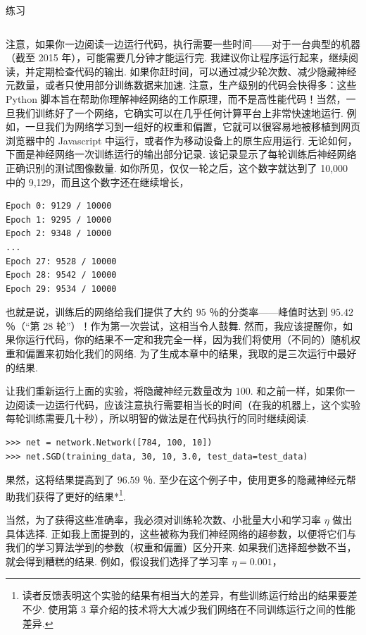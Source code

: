\begin{exerciseBox}{练习}
\begin{lstlisting}
\end{lstlisting}

注意，如果你一边阅读一边运行代码，执行需要一些时间——对于一台典型的机器（截至 2015 年），可能需要几分钟才能运行完. 我建议你让程序运行起来，继续阅读，并定期检查代码的输出. 如果你赶时间，可以通过减少轮次\label{term:43}数、减少隐藏神经元数量，或者只使用部分训练数据来加速. 注意，生产级别的代码会快得多：这些 Python 脚本旨在帮助你理解神经网络的工作原理，而不是高性能代码！当然，一旦我们训练好了一个网络，它确实可以在几乎任何计算平台上非常快速地运行. 例如，一旦我们为网络学习到一组好的权重和偏置，它就可以很容易地被移植到网页浏览器中的 Javascript 中运行，或者作为移动设备上的原生应用运行. 无论如何，下面是神经网络一次训练运行的输出部分记录. 该记录显示了每轮训练后神经网络正确识别的测试图像数量. 如你所见，仅仅一轮之后，这个数字就达到了 10,000 中的 9,129，而且这个数字还在继续增长，

\begin{lstlisting}
Epoch 0: 9129 / 10000
Epoch 1: 9295 / 10000
Epoch 2: 9348 / 10000
...
Epoch 27: 9528 / 10000
Epoch 28: 9542 / 10000
Epoch 29: 9534 / 10000

\end{lstlisting}

也就是说，训练后的网络给我们提供了大约 $95$ ％的分类率——峰值时达到 $95.42$ ％（``第 28 轮''）！作为第一次尝试，这相当令人鼓舞. 然而，我应该提醒你，如果你运行代码，你的结果不一定和我完全一样，因为我们将使用（不同的）随机权重和偏置来初始化我们的网络. 为了生成本章中的结果，我取的是三次运行中最好的结果.

让我们重新运行上面的实验，将隐藏神经元数量改为 $100$. 和之前一样，如果你一边阅读一边运行代码，应该注意执行需要相当长的时间（在我的机器上，这个实验每轮训练需要几十秒），所以明智的做法是在代码执行的同时继续阅读.

\begin{lstlisting}
>>> net = network.Network([784, 100, 10])
>>> net.SGD(training_data, 30, 10, 3.0, test_data=test_data)

\end{lstlisting}

果然，这将结果提高到了 $96.59$ ％. 至少在这个例子中，使用更多的隐藏神经元帮助我们获得了更好的结果*\footnote{读者反馈表明这个实验的结果有相当大的差异，有些训练运行给出的结果要差不少. 使用第 3 章介绍的技术将大大减少我们网络在不同训练运行之间的性能差异.}.

当然，为了获得这些准确率，我必须对训练轮次数、小批量大小和学习率 $\eta$ 做出具体选择. 正如我上面提到的，这些被称为我们神经网络的超参数\label{term:44}，以便将它们与我们的学习算法学到的参数（权重和偏置）区分开来. 如果我们选择超参数不当，就会得到糟糕的结果. 例如，假设我们选择了学习率 $\eta = 0.001$，


\end{exerciseBox}
